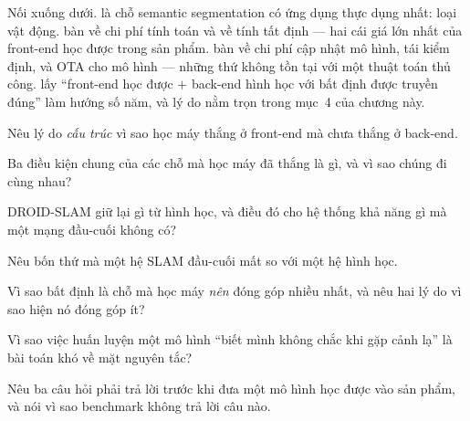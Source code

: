 \documentclass[../../vslam.tex]{subfiles}
\begin{document}
Nối xuống dưới.  là chỗ semantic segmentation có ứng dụng thực dụng nhất: loại vật động.  bàn về chi phí tính toán và về tính tất định --- hai cái giá lớn nhất của front-end học được trong sản phẩm.  bàn về chi phí cập nhật mô hình, tái kiểm định, và OTA cho mô hình --- những thứ không tồn tại với một thuật toán thủ công.  lấy ``front-end học được \(+\) back-end hình học với bất định được truyền đúng'' làm hướng số năm, và lý do nằm trọn trong mục~4 của chương này.

\begin{tukiem}
\item Nêu lý do \emph{cấu trúc} vì sao học máy thắng ở front-end mà chưa thắng ở back-end.
\item Ba điều kiện chung của các chỗ mà học máy đã thắng là gì, và vì sao chúng đi cùng nhau?
\item DROID-SLAM giữ lại gì từ hình học, và điều đó cho hệ thống khả năng gì mà một mạng đầu-cuối không có?
\item Nêu bốn thứ mà một hệ SLAM đầu-cuối mất so với một hệ hình học.
\item Vì sao bất định là chỗ mà học máy \emph{nên} đóng góp nhiều nhất, và nêu hai lý do vì sao hiện nó đóng góp ít?
\item Vì sao việc huấn luyện một mô hình ``biết mình không chắc khi gặp cảnh lạ'' là bài toán khó về mặt nguyên tắc?
\item Nêu ba câu hỏi phải trả lời trước khi đưa một mô hình học được vào sản phẩm, và nói vì sao benchmark không trả lời câu nào.
\end{tukiem}
\ifSubfilesClassLoaded{\printbibliography[title={Nguồn}]}{}
\end{document}
